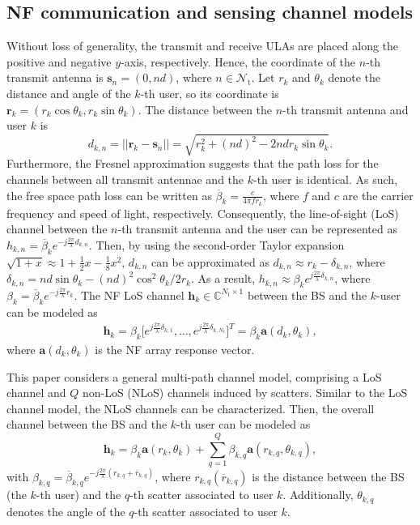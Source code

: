 \documentclass[10pt,journal,twocolumn]{IEEEtran}
\begin{document}
\subsection{NF communication and sensing channel models}
Without loss of generality, the transmit and receive ULAs are placed along the positive and negative $y$-axis, respectively. Hence, the coordinate of the $n$-th transmit antenna is $\mathbf{s}_n=\left(0, nd\right)$, where $n\in\mathcal{N}_{\text{t}}$. Let $r_k$ and $\theta_k$ denote the distance and angle of the $k$-th user, so its coordinate is $\mathbf{r}_k=\left(r_k\cos\theta_k,r_k\sin\theta_k\right)$. The distance between the $n$-th transmit antenna and user $k$ is 
\begin{equation}
d_{k,n}=||\mathbf{r}_k-\mathbf{s}_n|| = \sqrt{r^2_k+( nd)^2-2ndr_k\sin\theta_k}.
\end{equation}
Furthermore, the  Fresnel approximation suggests that the path loss for the channels between all transmit antennae and the $k$-th user is identical\cite{10220205}. As such, the free space path loss can be written as $\overline\beta_k=\frac{c}{4\pi fr_k}$, where $f$ and $c$ are the carrier frequency and speed of light, respectively. Consequently, the line-of-sight (LoS) channel between the $n$-th transmit antenna and the user can be represented as $h_{k,n}= \overline\beta_k e^{-j\frac{2\pi}{\lambda}d_{k,n}}$. Then, by using the second-order Taylor expansion $\sqrt{1+x}\approx 1+\frac{1}{2}x-\frac{1}{8}x^2$,  $d_{k,n}$ can be approximated as $d_{k,n}\approx r_k-\delta_{k,n}$, where $\delta_{k,n}=nd\sin\theta_k-(nd)^2\cos^2\theta_k/2r_k$\cite{10517348}. As a result,  $h_{k,n}\approx \beta_k e^{j\frac{2\pi}{\lambda}\delta_{k,n}}$, where $\beta_k=\overline\beta_ke^{-j\frac{2\pi}{\lambda}r_k}$. The NF LoS channel $\mathbf{h}_k\in\mathbb{C}^{N_{\text{t}}\times 1}$ between the BS and the $k$-user can be modeled as
\begin{align}
\mathbf{h}_k= \beta_k\big[e^{j\frac{2\pi}{\lambda}\delta_{k,1}},\dots,e^{j\frac{2\pi}{\lambda}\delta_{k,N_{\text{t}}}}\big]^T=\beta_k\mathbf{a}\left(d_k,\theta_k\right),
\label{Response_vector}
\end{align}
where $\mathbf{a}\left(d_k,\theta_k\right)$ is the NF array response vector.

This paper considers a general multi-path channel model, comprising a LoS channel and $Q$ non-LoS (NLoS) channels induced by scatters. Similar to the LoS channel model, the NLoS channels can be characterized. Then, the overall channel between the BS and the $k$-th user can be modeled as
\begin{equation}
\mathbf{h}_k= \beta_k\mathbf{a}\left(r_k,\theta_k\right) + \sum_{q=1}^{Q}\beta_{k,q}\mathbf{a}\left(r_{k,q},\theta_{k,q}\right),
\label{Overall_Channel}
\end{equation}
with $\beta_{k,q}=\overline\beta_{k,q} e^{-j\frac{2\pi}{\lambda}\left(r_{k,q}+\overline r_{k,q}\right)}$, where $r_{k,q} \left(\overline r_{k,q}\right)$ is the distance between the BS (the $k$-th user) and the $q$-th scatter associated to user $k$. Additionally, $\theta_{k,q}$ denotes the angle of the $q$-th scatter associated to user $k$. 
\end{document}
